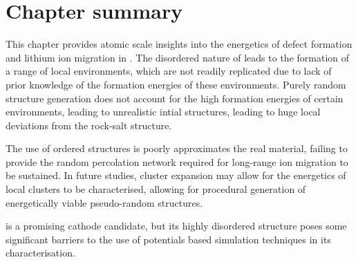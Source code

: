 \newpage
\section{Chapter summary}
This chapter provides atomic scale insights into the energetics of defect formation and lithium ion migration in .
The disordered nature of  leads to the formation of a range of local environments, which are not readily replicated due to lack of prior knowledge of the formation energies of these environments.
Purely random structure generation does not account for the high formation energies of certain environments, leading to unrealistic intial structures, leading to huge local deviations from the rock-salt structure.

The use of ordered structures is poorly approximates the real material, failing to provide the random percolation network required for long-range ion migration to be sustained.
In future studies, cluster expansion\cite{Chang2019} may allow for the energetics of local clusters to be characterised, allowing for procedural generation of energetically viable pseudo-random structures.

 is a promising cathode candidate, but its highly disordered structure poses some significant barriers to the use of potentials based simulation techniques in its characterisation.



\newpage
